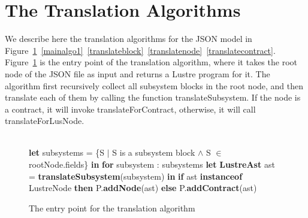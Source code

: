 \documentclass{article}
\begin{document}
\section{The Translation Algorithms}

We describe here the translation algorithms for the JSON model in Figure~\ref{mainalgo}~\ref{mainalgo1}~\ref{translateblock}~\ref{translatenode}~\ref{translatecontract}.
Figure~\ref{mainalgo} is the entry point of the translation algorithm, where it takes the root node of the JSON file as input and returns a Lustre program for it.
The algorithm first recursively collect all subsystem blocks in the root node, and then translate each of them by calling the function \textsf{translateSubsystem}. 
If the node is a contract, it will invoke \textsf{translateForContract}, 
otherwise, it will call \textsf{translateForLusNode}.


\begin{figure}
\begin{algorithmic}
\\
\State \textbf{let} subsystems = \{S $\mid$ S is a subsystem block $\land$ S $\in$ rootNode.fields\} \textbf{in}
\State \textbf{for} subsystem : subsystems
\State {\ \ \ \ } \textbf{let} \textbf{LustreAst} ast = \textbf{translateSubsystem}(subsystem) \textbf{in}
\State {\ \ \ \ } \textbf{if}  ast \textbf{instanceof} LustreNode \textbf{then}
\State {\ \ \ \ \ \ \ \ } P.\textbf{addNode}(ast)
\State {\ \ \ \ } \textbf{else}
\State {\ \ \ \ \ \ \ \ } P.\textbf{addContract}(ast)
\EndFunction
\end{algorithmic}
\label{mainalgo}
\caption{The entry point for the translation algorithm}
\end{figure}
\end{document}
